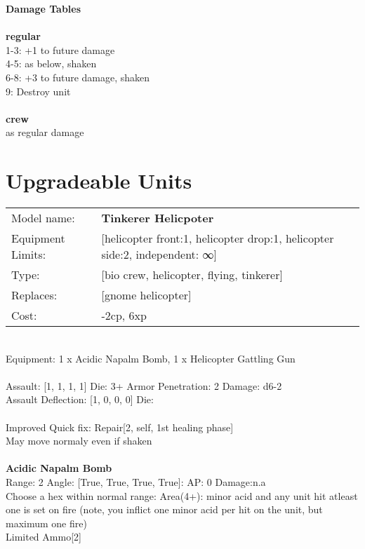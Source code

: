 {\bf Damage Tables} \\
\ \\ {\bf regular } \\
1-3: +1 to future damage \\
4-5: as below, shaken \\
6-8: +3 to future damage, shaken \\
9: Destroy unit \\
\ \\ {\bf crew } \\
as regular damage \\










\pagebreak\section{Upgradeable Units}\noindent
\begin{tabular}{ll}
Model name: &{\bf Tinkerer Helicpoter } \\
Equipment Limits: &[helicopter front:1, helicopter drop:1, helicopter side:2, independent: ∞] \\
Type: &[bio crew, helicopter, flying, tinkerer] \\
Replaces: &[gnome helicopter] \\
Cost: & -2cp, 6xp\\
\end{tabular}
\ \\
Equipment: 1 x Acidic Napalm Bomb, 1 x Helicopter Gattling Gun \\
\ \\
Assault: [1, 1, 1, 1] Die: 3+ Armor Penetration: 2 Damage: d6-2 \\
Assault Deflection: [1, 0, 0, 0] Die: \\
\indent  
\ \\
Improved Quick fix: Repair[2, self, 1st healing phase]\\ 
May move normaly even if shaken\\ 

\ \\
{\bf Acidic Napalm Bomb } \\



Range: 2  Angle: [True, True, True, True]: AP: 0 Damage:n.a \\
Choose a hex within normal range: Area(4+): minor acid and any unit hit atleast one is set on fire (note, you inflict one minor acid per hit on the unit, but maximum one fire)\\ 
Limited Ammo[2]\\ 




